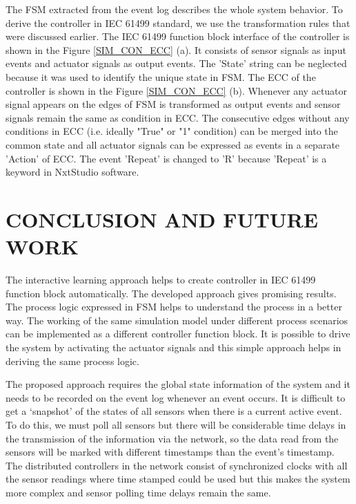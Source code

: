 \documentclass[conference]{IEEEtran}
\begin{document}
The FSM extracted from the event log describes the whole system behavior. To derive the controller in IEC 61499 standard, we use the transformation rules that were discussed earlier. The IEC 61499 function block interface of the controller is shown in the Figure \ref{SIM_CON_ECC} (a). It consists of sensor signals as input events and actuator signals as output events. The 'State' string can be neglected because it was used to identify the unique state in FSM.  The ECC of the controller is shown in the Figure  \ref{SIM_CON_ECC} (b). Whenever any actuator signal appears on the edges of FSM is transformed as output events and sensor signals remain the same as condition in ECC. The consecutive edges without any conditions in ECC (i.e. ideally "True" or "1" condition)   can be merged into the common state and all actuator signals can be expressed as  events in a separate 'Action' of ECC. The event 'Repeat' is changed to 'R' because 'Repeat' is a keyword in NxtStudio software. 





\section{CONCLUSION AND FUTURE WORK}
\label{sec:conclusion}


The interactive learning approach helps to create controller in IEC 61499 function block automatically. The developed approach gives promising results. The process logic expressed in FSM helps to understand the process in a better way.  The working of the same simulation model under different process scenarios can be implemented as a different controller function block. It is possible to drive  the system by activating the actuator signals and this simple approach helps in deriving the same process logic.  


The proposed approach requires the global state information of the system and it needs to be recorded on the event log whenever an event occurs. It is difficult to get a ‘snapshot’ of the states of all sensors when there is a current active event.  To do this, we must poll all sensors but there will be considerable time delays in the transmission of the information via the network, so the data read from the sensors will be marked with different timestamps than the event’s timestamp. The distributed controllers in the network consist of synchronized clocks with all the sensor readings where time stamped could be used but this makes the system more complex and sensor polling time delays remain the same. 
\end{document}
